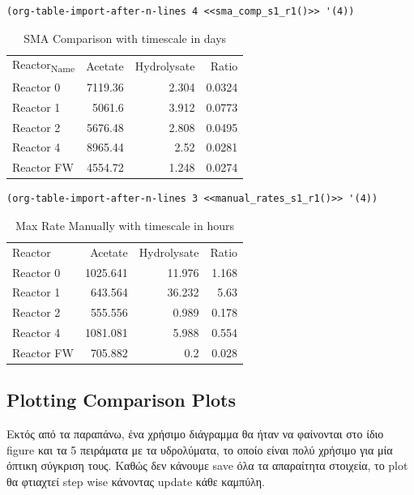 \documentclass[11pt]{article}
\begin{document}
\begin{verbatim}
(org-table-import-after-n-lines 4 <<sma_comp_s1_r1()>> '(4))
\end{verbatim}

\begin{table}[htbp]
\caption{SMA Comparison with timescale in days}
\centering
\begin{tabular}{lrrr}
Reactor\textsubscript{Name} & Acetate & Hydrolysate & Ratio\\[0pt]
Reactor 0 & 7119.36 & 2.304 & 0.0324\\[0pt]
Reactor 1 & 5061.6 & 3.912 & 0.0773\\[0pt]
Reactor 2 & 5676.48 & 2.808 & 0.0495\\[0pt]
Reactor 4 & 8965.44 & 2.52 & 0.0281\\[0pt]
Reactor FW & 4554.72 & 1.248 & 0.0274\\[0pt]
\end{tabular}
\end{table}

\begin{verbatim}
(org-table-import-after-n-lines 3 <<manual_rates_s1_r1()>> '(4))
\end{verbatim}

\begin{table}[htbp]
\caption{Max Rate Manually with timescale in hours}
\centering
\begin{tabular}{lrrr}
Reactor & Acetate & Hydrolysate & Ratio\\[0pt]
Reactor 0 & 1025.641 & 11.976 & 1.168\\[0pt]
Reactor 1 & 643.564 & 36.232 & 5.63\\[0pt]
Reactor 2 & 555.556 & 0.989 & 0.178\\[0pt]
Reactor 4 & 1081.081 & 5.988 & 0.554\\[0pt]
Reactor FW & 705.882 & 0.2 & 0.028\\[0pt]
\end{tabular}
\end{table}

\subsection{Plotting Comparison Plots}
\label{sec:org4c5b5d2}
Εκτός από τα παραπάνω, ένα χρήσιμο διάγραμμα θα ήταν να φαίνονται στο ίδιο figure και τα 5 πειράματα με τα υδρολύματα, το οποίο είναι πολύ χρήσιμο για μία όπτικη σύγκριση τους. Καθώς δεν κάνουμε save όλα τα απαραίτητα στοιχεία, το plot θα φτιαχτεί step wise κάνοντας update κάθε καμπύλη.
\end{document}
